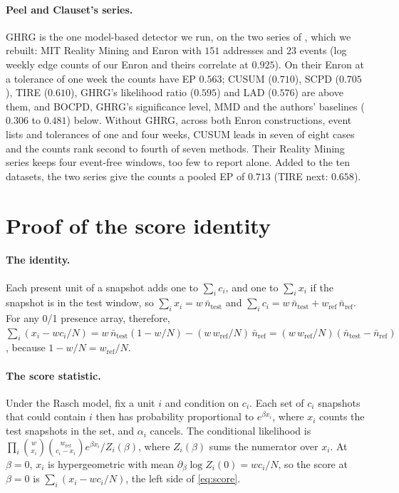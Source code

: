 \documentclass[11pt]{article}
\theoremstyle{dsplain}
\theoremstyle{definition}
\begin{document}
\paragraph{Peel and Clauset's series.} GHRG is the one model-based detector we run, on the two series of
\citet{peel2015detecting}, which we rebuilt: MIT Reality Mining \citep{eagle2006reality} and Enron with
$151$ addresses and $23$ events (log weekly edge counts of our Enron and theirs correlate at $0.925$). On
their Enron at a tolerance of one week the counts have EP $0.563$; CUSUM ($0.710$), SCPD ($0.705$), TIRE
($0.610$), GHRG's likelihood ratio ($0.595$) and LAD ($0.576$) are above them, and BOCPD, GHRG's
significance level, MMD and the authors' baselines ($0.306$ to $0.481$) below. Without GHRG, across both Enron
constructions, event lists and tolerances of one and four weeks, CUSUM leads in seven of eight cases and
the counts rank second to fourth of seven methods. Their Reality Mining series keeps four event-free
windows, too few to report alone. Added to the ten datasets, the two series give the counts a pooled EP of
$0.713$ (TIRE next: $0.658$).

\section{Proof of the score identity}
\label{app:proofs}

\paragraph{The identity.} Each present unit of a snapshot adds one to $\sum_i c_i$, and one to
$\sum_i x_i$ if the snapshot is in the test window, so $\sum_i x_i = w\,\bar n_{\mathrm{test}}$ and
$\sum_i c_i = w\,\bar n_{\mathrm{test}} + w_{\mathrm{ref}}\,\bar n_{\mathrm{ref}}$. For any 0/1
presence array, therefore, $\sum_i (x_i - w c_i/N) = w\,\bar n_{\mathrm{test}}(1 - w/N) -
(w\,w_{\mathrm{ref}}/N)\,\bar n_{\mathrm{ref}} = (w\,w_{\mathrm{ref}}/N)(\bar n_{\mathrm{test}} -
\bar n_{\mathrm{ref}})$, because $1 - w/N = w_{\mathrm{ref}}/N$.

\paragraph{The score statistic.} Under the Rasch model, fix a unit $i$ and condition on $c_i$. Each
set of $c_i$ snapshots that could contain $i$ then has probability proportional to $e^{\beta x_i}$,
where $x_i$ counts the test snapshots in the set, and $\alpha_i$ cancels. The conditional likelihood
is $\prod_i \binom{w}{x_i}\binom{w_{\mathrm{ref}}}{c_i - x_i} e^{\beta x_i}/Z_i(\beta)$, where
$Z_i(\beta)$ sums the numerator over $x_i$. At $\beta = 0$, $x_i$ is hypergeometric with mean
$\partial_\beta \log Z_i(0) = w c_i/N$, so the score at $\beta = 0$ is $\sum_i (x_i - w c_i/N)$,
the left side of \eqref{eq:score}.
\end{document}
